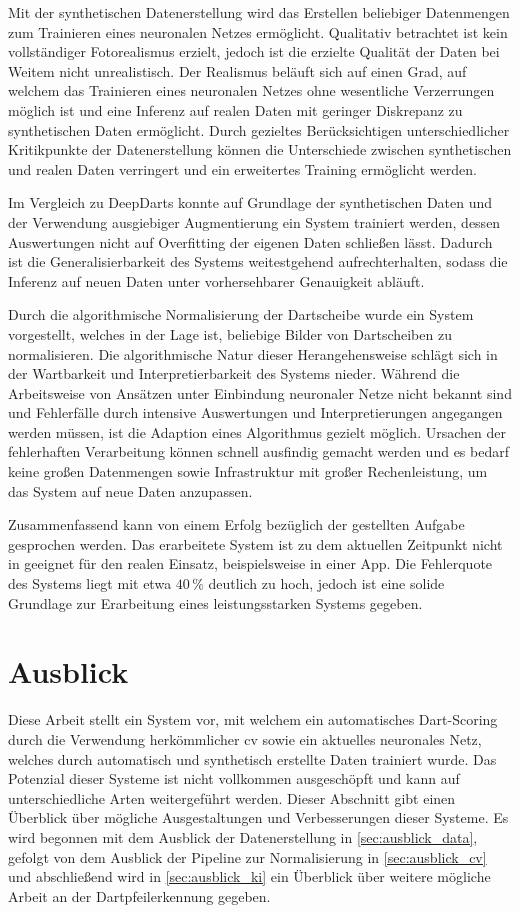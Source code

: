Mit der synthetischen Datenerstellung wird das Erstellen beliebiger Datenmengen zum Trainieren eines neuronalen Netzes ermöglicht. Qualitativ betrachtet ist kein vollständiger Fotorealismus erzielt, jedoch ist die erzielte Qualität der Daten bei Weitem nicht unrealistisch. Der Realismus beläuft sich auf einen Grad, auf welchem das Trainieren eines neuronalen Netzes ohne wesentliche Verzerrungen möglich ist und eine Inferenz auf realen Daten mit geringer Diskrepanz zu synthetischen Daten ermöglicht. Durch gezieltes Berücksichtigen unterschiedlicher Kritikpunkte der Datenerstellung können die Unterschiede zwischen synthetischen und realen Daten verringert und ein erweitertes Training ermöglicht werden.

Im Vergleich zu DeepDarts konnte auf Grundlage der synthetischen Daten und der Verwendung ausgiebiger Augmentierung ein System trainiert werden, dessen Auswertungen nicht auf Overfitting der eigenen Daten schließen lässt. Dadurch ist die Generalisierbarkeit des Systems weitestgehend aufrechterhalten, sodass die Inferenz auf neuen Daten unter vorhersehbarer Genauigkeit abläuft.

Durch die algorithmische Normalisierung der Dartscheibe wurde ein System vorgestellt, welches in der Lage ist, beliebige Bilder von Dartscheiben zu normalisieren. Die algorithmische Natur dieser Herangehensweise schlägt sich in der Wartbarkeit und Interpretierbarkeit des Systems nieder. Während die Arbeitsweise von Ansätzen unter Einbindung neuronaler Netze nicht bekannt sind und Fehlerfälle durch intensive Auswertungen und Interpretierungen angegangen werden müssen, ist die Adaption eines Algorithmus gezielt möglich. Ursachen der fehlerhaften Verarbeitung können schnell ausfindig gemacht werden und es bedarf keine großen Datenmengen sowie Infrastruktur mit großer Rechenleistung, um das System auf neue Daten anzupassen.

Zusammenfassend kann von einem Erfolg bezüglich der gestellten Aufgabe gesprochen werden. Das erarbeitete System ist zu dem aktuellen Zeitpunkt nicht in geeignet für den realen Einsatz, beispielsweise in einer App. Die Fehlerquote des Systems liegt mit etwa $40\,\%$ deutlich zu hoch, jedoch ist eine solide Grundlage zur Erarbeitung eines leistungsstarken Systems gegeben.

\section{Ausblick}
\label{sec:ausblick}

Diese Arbeit stellt ein System vor, mit welchem ein automatisches Dart-Scoring durch die Verwendung herkömmlicher \ac{cv} sowie ein aktuelles neuronales Netz, welches durch automatisch und synthetisch erstellte Daten trainiert wurde. Das Potenzial dieser Systeme ist nicht vollkommen ausgeschöpft und kann auf unterschiedliche Arten weitergeführt werden. Dieser Abschnitt gibt einen Überblick über mögliche Ausgestaltungen und Verbesserungen dieser Systeme. Es wird begonnen mit dem Ausblick der Datenerstellung in \autoref{sec:ausblick_data}, gefolgt von dem Ausblick der Pipeline zur Normalisierung in \autoref{sec:ausblick_cv} und abschließend wird in \autoref{sec:ausblick_ki} ein Überblick über weitere mögliche Arbeit an der Dartpfeilerkennung gegeben.

